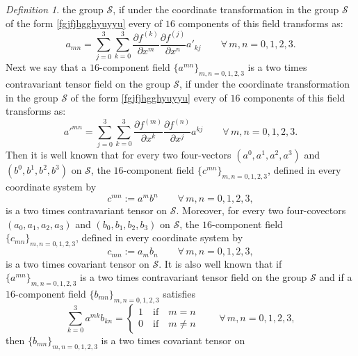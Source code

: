 \documentclass{article}
\theoremstyle{definition}
\newtheorem{definition}{Definition}[section]
\theoremstyle{remark}
\newcommand{\er}{\eqref}
\newcommand{\er}{\eqref}
\newtheorem{definition}{Definition}
\begin{document}
\begin{definition}
the group $\mathcal{S}$, if under the coordinate transformation in
the group $\mathcal{S}$ of the form \er{fgjfjhgghyuyyu} every of
$16$ components of this field transforms as:
\begin{equation}\label{fgjfjhgghhgjghjhjkkkkjjk}
a_{mn}=\sum_{j=0}^{3}\sum_{k=0}^{3}\frac{\partial f^{(k)}}{\partial
x^m}\frac{\partial f^{(j)}}{\partial x^n}a'_{kj}\quad\quad\forall\,
m,n=0,1,2,3.
\end{equation}
Next we say that a $16$-component field $\{a^{mn}\}_{m,n=0,1,2,3}$
is a two times contravariant tensor field on the group
$\mathcal{S}$, if under the coordinate transformation in the group
$\mathcal{S}$ of the form \er{fgjfjhgghyuyyu} every of $16$
components of this field transforms as:
\begin{equation}\label{fgjfjhgghhgjghjhjkkkkgggh}
a'^{mn}=\sum_{j=0}^{3}\sum_{k=0}^{3}\frac{\partial f^{(m)}}{\partial
x^k}\frac{\partial f^{(n)}}{\partial x^j}a^{kj}\quad\quad\forall\,
m,n=0,1,2,3.
\end{equation}
Then it is well known that for every two four-vectors
$(a^0,a^1,a^2,a^3)$ and $(b^0,b^1,b^2,b^3)$ on $\mathcal{S}$, the
$16$-component field $\{c^{mn}\}_{m,n=0,1,2,3}$, defined in every
coordinate system by
\begin{equation}\label{fgjfjhgghhgjghjhjkkkkgjghghjljl}
c^{mn}:=a^mb^n\quad\quad\forall\, m,n=0,1,2,3,
\end{equation}
is a two times contravariant tensor on $\mathcal{S}$. Moreover, for
every two four-covectors $(a_0,a_1,a_2,a_3)$ and $(b_0,b_1,b_2,b_3)$
on $\mathcal{S}$, the $16$-component field
$\{c_{mn}\}_{m,n=0,1,2,3}$, defined in every coordinate system by
\begin{equation}\label{fgjfjhgghhgjghjhjkkkkgjghghkkkj}
c_{mn}:=a_mb_n\quad\quad\forall\, m,n=0,1,2,3,
\end{equation}
is a two times covariant tensor on $\mathcal{S}$. It is also well
known that if $\{a^{mn}\}_{m,n=0,1,2,3}$ is a two times
contravariant tensor field on the group $\mathcal{S}$ and if a
$16$-component field $\{b_{mn}\}_{m,n=0,1,2,3}$ satisfies
\begin{equation}\label{fgjfjhgghhgjghjhjkkkkgjghghuiiiu}
\sum_{k=0}^{3}a^{mk}b_{kn}=\begin{cases}
1\quad\text{if}\quad m=n\\
0\quad\text{if}\quad m\neq n
\end{cases}\quad\quad\forall\, m,n=0,1,2,3,
\end{equation}
then $\{b_{mn}\}_{m,n=0,1,2,3}$ is a two times covariant tensor on

\end{definition}
\end{document}

